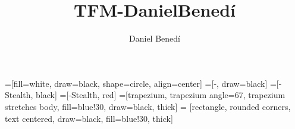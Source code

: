 \usepackage{tikz}
\usetikzlibrary{positioning,quotes,shapes.geometric,arrows.meta}
=[fill=white, draw=black, shape=circle, align=center]
=[-, draw=black]
=[-Stealth, black]
=[-Stealth, red]
=[trapezium, trapezium angle=67, trapezium stretches body, fill=blue!30, draw=black, thick]
 = [rectangle, rounded corners, text centered, draw=black, fill=blue!30, thick]
\usepackage{pgf}

\usepackage{cprotect}

\newcommand{\mst}{\texorpdfstring{$\mathsf{MST}$}{MST}}
\newcommand{\msts}{\texorpdfstring{$\mathsf{MST}s$}{MSTs}}
\newcommand{\mstof}[1]{$\mathsf{MST}_{#1}$}
\newcommand{\dynmst}{\mathsf{Dynamic\_MST}}
\newcommand{\dpm}{\texorpdfstring{$\mathsf{DPA}$}{DPA}}
\newcommand{\DP}{$\mathsf{DP}$}

\newcommand{\DPmst}{\texttt{DP\_{Kruskal}}}
\newcommand{\DPmstv}[1]{\texttt{DP\_{Kruskal\_{#1}}}}

\newcommand{\FKruskal}{\texttt{Filter\_{Kruskal}}}
\newcommand{\Kruskal}{\texttt{Kruskal}}

\newcommand{\opinsert}[0]{{\tt insert}}
\newcommand{\opupdate}[0]{{\tt update}}
\newcommand{\opremove}[0]{{\tt remove}}
\newcommand{\opmst}[0]{{\tt mst}}

\newcommand{\Go}{{\tt Go}}
\newcommand{\Golang}{{\tt Golang}}

\newcommand{\AD}[1]{{\color{red} AD: #1} \PackageWarning{teaching}{Comment from AD}}
\newcommand{\DB}[1]{{\color{blue} DB: #1}\PackageWarning{teaching}{Comment from DB}}
\newcommand{\EP}[1]{{\color{magenta} EP: #1}\PackageWarning{teaching}{Comment from EP}}




\title{TFM-DanielBenedí}
\author{Daniel Benedí}
\date{\monthyeardate}
